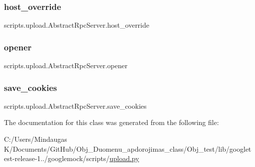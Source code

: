 \subsubsection{\texorpdfstring{host\_override}{host\_override}}
{\footnotesize\ttfamily scripts.\+upload.\+Abstract\+Rpc\+Server.\+host\+\_\+override}

\mbox{\label{classscripts_1_1upload_1_1_abstract_rpc_server_acfc8cd519514866976af9d997cf04c54}} 
\subsubsection{\texorpdfstring{opener}{opener}}
{\footnotesize\ttfamily scripts.\+upload.\+Abstract\+Rpc\+Server.\+opener}

\mbox{\label{classscripts_1_1upload_1_1_abstract_rpc_server_a1012fa8f90f4b5eed66f83a1d6a08b7c}} 
\subsubsection{\texorpdfstring{save\_cookies}{save\_cookies}}
{\footnotesize\ttfamily scripts.\+upload.\+Abstract\+Rpc\+Server.\+save\+\_\+cookies}



The documentation for this class was generated from the following file\+:\begin{DoxyCompactItemize}
\item 
C\+:/\+Users/\+Mindaugas K/\+Documents/\+Git\+Hub/\+Obj\+\_\+\+Duomenu\+\_\+apdorojimas\+\_\+class/\+Obj\+\_\+test/lib/googletest-\/release-\/1../googlemock/scripts/\mbox{\hyperlink{_obj__test_2lib_2googletest-release-1_88_81_2googlemock_2scripts_2upload_8py}{upload.\+py}}\end{DoxyCompactItemize}
